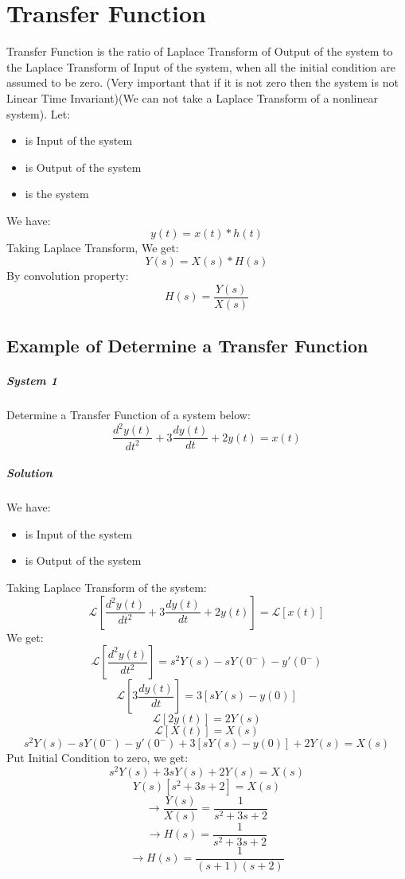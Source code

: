 \chapter{Transfer Function}
Transfer Function is the ratio of Laplace Transform of Output of the system to the Laplace Transform of Input of the system, when all the initial condition are assumed to be zero. (Very important that if it is not zero then the system is not Linear Time Invariant)(We can not take a Laplace Transform of a nonlinear system).
Let:
\begin{itemize}
	\item { is Input of the system}
	\item { is Output of the system}
	\item { is the system}
\end{itemize}
We have:
\begin{equation}
	y(t) = x(t)*h(t)
\end{equation}
Taking Laplace Transform, We get:
\begin{equation}
	Y(s) = X(s)*H(s)
\end{equation}
By convolution property:
\begin{equation}
	\boxed{H(s) = \frac{Y(s)}{X(s)}}
\end{equation}

\section{Example of Determine a Transfer Function}
\paragraph{System 1} Determine a Transfer Function of a system below:
\[\frac{d^2y(t)}{d t^2} + 3\frac{dy(t)}{d t} + 2 y(t) = x(t)\]
\paragraph{Solution} We have:
\begin{itemize}
	\item { is Input of the system}
	\item { is Output of the system}
\end{itemize}
Taking Laplace Transform of the system:
\[\mathcal{L}[\frac{d^2y(t)}{d t^2} + 3\frac{dy(t)}{d t} + 2 y(t)] = \mathcal{L}[x(t)]\]
We get:
\[\mathcal{L}[\frac{d^2y(t)}{d t^2}] = s^2Y(s) - sY(0^-) -y'(0^-)\]
\[\mathcal{L}[3\frac{dy(t)}{d t}] = 3[sY(s) - y(0)]\]
\[\mathcal{L}[2 y(t)] = 2Y(s)\]
\[\mathcal{L}[X(t)] = X(s)\]
\[s^2Y(s) - sY(0^-) -y'(0^-) + 3[sY(s) - y(0)] + 2Y(s) = X(s)\]
Put Initial Condition to zero, we get:
\[s^2Y(s) + 3sY(s) + 2Y(s) = X(s)\]
\[Y(s)[s^2 + 3s +2 ] = X(s)\]
\[\rightarrow \frac{Y(s)}{X(s)} = \frac{1}{s^2 + 3s +2}\]
\[\rightarrow H(s) = \frac{1}{s^2 + 3s +2}\]
\[\rightarrow \boxed{H(s) = \frac{1}{(s+1)(s+2)}}\]


